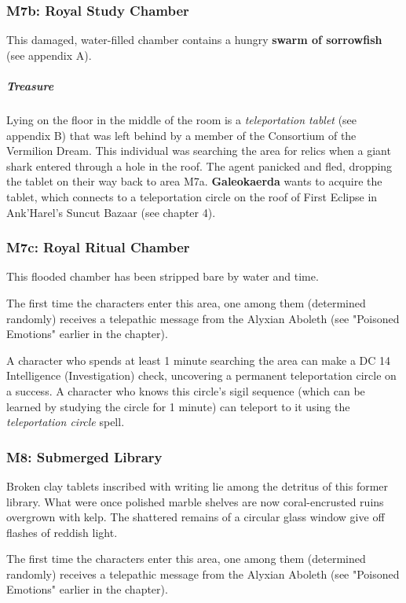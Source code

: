 \documentclass[10pt,a4paper,twoside,fancy,bg=print,twocolumn,openany,nodeprecatedcode]{dndbook}
\begin{document}
\subsubsection{M7b: Royal Study Chamber}
This damaged, water-filled chamber contains a hungry \textbf{swarm of sorrowfish} (see appendix A).

\subparagraph{Treasure}
Lying on the floor in the middle of the room is a \textit{teleportation tablet} (see appendix B) that was left behind by a member of the Consortium of the Vermilion Dream. This individual was searching the area for relics when a giant shark entered through a hole in the roof. The agent panicked and fled, dropping the tablet on their way back to area M7a. \textbf{Galeokaerda} wants to acquire the tablet, which connects to a teleportation circle on the roof of First Eclipse in Ank'Harel's Suncut Bazaar (see chapter 4).

\subsubsection{M7c: Royal Ritual Chamber}
This flooded chamber has been stripped bare by water and time.

The first time the characters enter this area, one among them (determined randomly) receives a telepathic message from the Alyxian Aboleth (see "Poisoned Emotions" earlier in the chapter).

A character who spends at least 1 minute searching the area can make a DC 14 Intelligence (Investigation) check, uncovering a permanent teleportation circle on a success. A character who knows this circle's sigil sequence (which can be learned by studying the circle for 1 minute) can teleport to it using the \textit{teleportation circle} spell.

\subsubsection{M8: Submerged Library}
\begin{DndReadAloud}{}
Broken clay tablets inscribed with writing lie among the detritus of this former library. What were once polished marble shelves are now coral-encrusted ruins overgrown with kelp. The shattered remains of a circular glass window give off flashes of reddish light.

\end{DndReadAloud}

The first time the characters enter this area, one among them (determined randomly) receives a telepathic message from the Alyxian Aboleth (see "Poisoned Emotions" earlier in the chapter).
\end{document}
